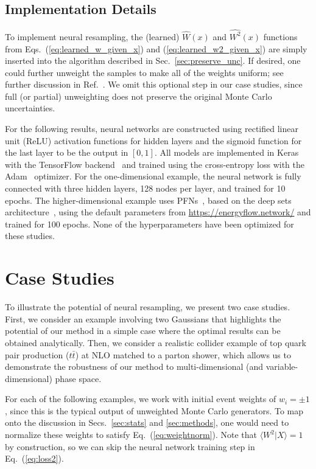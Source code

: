\documentclass[prd,twocolumn,superscriptaddress,longbibliography,preprintnumbers,floatfix,nofootinbib]{revtex4-1}
\DeclareRobustCommand{\Sec}[1]{Sec.~\ref{sec:#1}}
\DeclareRobustCommand{\Secs}[2]{Secs.~\ref{sec:#1} and \ref{sec:#2}}
\DeclareRobustCommand{\Eq}[1]{Eq.~(\ref{eq:#1})}
\DeclareRobustCommand{\Eqs}[2]{Eqs.~(\ref{eq:#1}) and (\ref{eq:#2})}
\DeclareRobustCommand{\Ref}[1]{Ref.~\cite{#1}}
\newcommand{\Keras}{{\sc Keras}\xspace}
\newcommand{\TensorFlow}{{\sc TensorFlow}\xspace}
\newcommand{\Adam}{{\sc Adam}\xspace}
\begin{document}
\subsection{Implementation Details}

To implement neural resampling, the (learned) $\widehat{W}(x)$ and $\widehat{W^2}(x)$ functions from \Eqs{learned_w_given_x}{learned_w2_given_x} are simply inserted into the algorithm described in \Sec{preserve_unc}.
%
If desired, one could further unweight the samples to make all of the weights uniform; see further discussion in \Ref{andersen2020positive}.
%
We omit this optional step in our case studies, since full (or partial) unweighting does not preserve the original Monte Carlo uncertainties.


For the following results, neural networks are constructed using rectified linear unit (ReLU) activation functions for hidden layers and the sigmoid function for the last layer to be the output in $[0,1]$.
%
All models are implemented in \Keras~\cite{keras} with the \TensorFlow backend~\cite{tensorflow} and trained using the cross-entropy loss with the \Adam~\cite{adam} optimizer.
%
For the one-dimensional example, the neural network is fully connected with three hidden layers, 128 nodes per layer, and trained for 10 epochs.
%
The higher-dimensional example uses PFNs~\cite{Komiske:2018cqr}, based on the deep sets architecture~\cite{NIPS2017_6931}, using the default parameters from \url{https://energyflow.network/} and trained for 100 epochs.
%
None of the hyperparameters have been optimized for these studies.


\section{Case Studies}
\label{sec:results}

To illustrate the potential of neural resampling, we present two case studies.
%
First, we consider an example involving two Gaussians that highlights the potential of our method in a simple case where the optimal results can be obtained analytically.
%
Then, we consider a realistic collider example of top quark pair production ($t\bar{t}$) at NLO matched to a parton shower, which allows us to demonstrate the robustness of our method to multi-dimensional (and variable-dimensional) phase space. 

For each of the following examples, we work with initial event weights of $w_i = \pm 1$, since this is the typical output of unweighted Monte Carlo generators.
%
To map onto the discussion in \Secs{stats}{methods}, one would need to normalize these weights to satisfy \Eq{weightnorm}.
%
Note that $\langle W^2|X\rangle = 1$ by construction, so we can skip the neural network training step in \Eq{loss2}.
\end{document}
